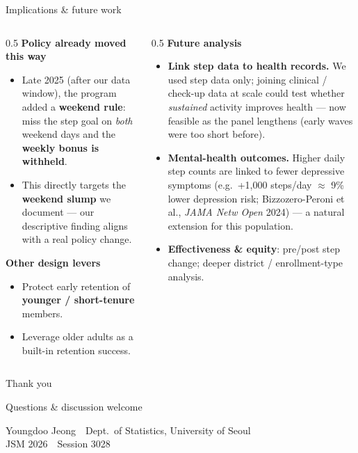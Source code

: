 \documentclass[10pt,aspectratio=169]{beamer}
\newcommand{\hc}[1]{{\color{coral}\bfseries #1}}
\begin{document}
\begin{frame}{Implications \& future work}
  \begin{columns}[T]
    \begin{column}{0.5\textwidth}
      \textbf{\color{ink}Policy already moved this way}
      \begin{itemize}
        \item Late 2025 (after our data window), the program added a \textbf{weekend rule}: miss the step goal on \emph{both} weekend days and the \textbf{weekly bonus is withheld}.
        \item This directly targets the \hc{weekend slump} we document --- our descriptive finding aligns with a real policy change.
      \end{itemize}
      \vspace*{0.3em}
      \textbf{\color{ink}Other design levers}
      \begin{itemize}
        \item Protect early retention of \textbf{younger / short-tenure} members.
        \item Leverage older adults as a built-in retention success.
      \end{itemize}
    \end{column}
    \begin{column}{0.5\textwidth}
      \textbf{\color{ink}Future analysis}
      \begin{itemize}
        \item \textbf{Link step data to health records.} We used step data only; joining clinical / check-up data at scale could test whether \emph{sustained} activity improves health --- now feasible as the panel lengthens (early waves were too short before).
        \item \textbf{Mental-health outcomes.} Higher daily step counts are linked to fewer depressive symptoms (e.g.\ +1{,}000 steps/day $\approx$ 9\% lower depression risk; Bizzozero-Peroni et al., \textit{JAMA Netw Open} 2024) --- a natural extension for this population.
        \item \textbf{Effectiveness \& equity}: pre/post step change; deeper district / enrollment-type analysis.
      \end{itemize}
    \end{column}
  \end{columns}
\end{frame}

\begin{frame}[standout]
  Thank you
  \vspace{0.6em}

  {\normalsize Questions \& discussion welcome}
  \vspace{1.2em}

  {\footnotesize Youngdoo Jeong \,\textbullet\, Dept.\ of Statistics, University of Seoul \\[0.2em]
  JSM 2026 \,\textbullet\, Session 3028}
\end{frame}
\end{document}
